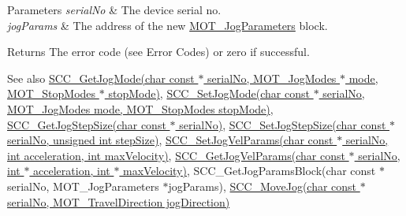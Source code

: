 \begin{DoxyParams}{Parameters}
{\em serial\+No} & The device serial no. \\
\hline
{\em jog\+Params} & The address of the new \hyperlink{struct_m_o_t___jog_parameters}{M\+O\+T\+\_\+\+Jog\+Parameters} block. \\
\hline
\end{DoxyParams}
\begin{DoxyReturn}{Returns}
The error code (see Error Codes) or zero if successful. 
\end{DoxyReturn}
\begin{DoxySeeAlso}{See also}
\hyperlink{group___t_cube_stepper_ga2a46e3c180400d1387cb057cdf94c6c4}{S\+C\+C\+\_\+\+Get\+Jog\+Mode(char const $\ast$ serial\+No, M\+O\+T\+\_\+\+Jog\+Modes $\ast$ mode, M\+O\+T\+\_\+\+Stop\+Modes $\ast$ stop\+Mode)}, \hyperlink{group___t_cube_stepper_gae802a1cc2dbbc7c195707e7dc8edd7bc}{S\+C\+C\+\_\+\+Set\+Jog\+Mode(char const $\ast$ serial\+No, M\+O\+T\+\_\+\+Jog\+Modes mode, M\+O\+T\+\_\+\+Stop\+Modes stop\+Mode)}, \hyperlink{group___t_cube_stepper_gafddac4a09a4df4ec56756592559c2940}{S\+C\+C\+\_\+\+Get\+Jog\+Step\+Size(char const $\ast$ serial\+No)}, \hyperlink{group___t_cube_stepper_ga7ac0f4bd9b83c05a0ec6b7cf33b00ae2}{S\+C\+C\+\_\+\+Set\+Jog\+Step\+Size(char const $\ast$ serial\+No, unsigned int step\+Size)}, \hyperlink{group___t_cube_stepper_gabf0a72b1c8e1751bffeac150bfa2596a}{S\+C\+C\+\_\+\+Set\+Jog\+Vel\+Params(char const $\ast$ serial\+No, int acceleration, int max\+Velocity)}, \hyperlink{group___t_cube_stepper_gabdc0d8df25714517d6905c53a106f021}{S\+C\+C\+\_\+\+Get\+Jog\+Vel\+Params(char const $\ast$ serial\+No, int $\ast$ acceleration, int $\ast$ max\+Velocity)}, S\+C\+C\+\_\+\+Get\+Jog\+Params\+Block(char const $\ast$ serial\+No, M\+O\+T\+\_\+\+Jog\+Parameters $\ast$jog\+Params), \hyperlink{group___t_cube_stepper_ga76a2ed08c67a983a7ac58e5201cbb1c4}{S\+C\+C\+\_\+\+Move\+Jog(char const $\ast$ serial\+No, M\+O\+T\+\_\+\+Travel\+Direction jog\+Direction)}


\end{DoxySeeAlso}

\begin{DoxyCodeInclude}
\end{DoxyCodeInclude}
